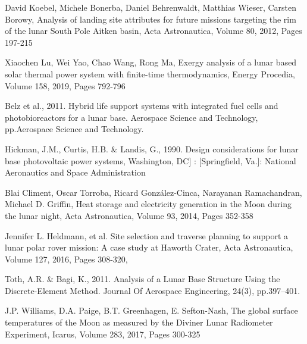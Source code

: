 \documentclass{beamer}
\begin{document}
\begin{thebibliography}{99}



David Koebel, Michele Bonerba, Daniel Behrenwaldt, Matthias Wieser, Carsten Borowy,
Analysis of landing site attributes for future missions targeting the rim of the lunar South Pole Aitken basin,
Acta Astronautica,
Volume 80,
2012,
Pages 197-215

Xiaochen Lu, Wei Yao, Chao Wang, Rong Ma,
Exergy analysis of a lunar based solar thermal power system with finite-time thermodynamics,
Energy Procedia,
Volume 158,
2019,
Pages 792-796


 Belz et al., 2011. Hybrid life support systems with integrated fuel cells and photobioreactors for a lunar base. Aerospace Science and Technology, pp.Aerospace Science and Technology.

Hickman, J.M., Curtis, H.B. \& Landis, G., 1990. Design considerations for lunar base photovoltaic power systems, Washington, DC] : [Springfield, Va.]: National Aeronautics and Space Administration

Blai Climent, Oscar Torroba, Ricard González-Cinca, Narayanan Ramachandran, Michael D. Griffin,
Heat storage and electricity generation in the Moon during the lunar night,
Acta Astronautica,
Volume 93,
2014,
Pages 352-358

Jennifer L. Heldmann, et al. Site selection and traverse planning to support a lunar polar rover mission: A case study at Haworth Crater,
Acta Astronautica, Volume 127, 2016, Pages 308-320,

Toth, A.R. \& Bagi, K., 2011. Analysis of a Lunar Base Structure Using the Discrete-Element Method. Journal Of Aerospace Engineering, 24(3), pp.397–401.

J.P. Williams, D.A. Paige, B.T. Greenhagen, E. Sefton-Nash,
The global surface temperatures of the Moon as measured by the Diviner Lunar Radiometer Experiment,
Icarus,
Volume 283,
2017,
Pages 300-325

\end{thebibliography}
\end{document}
